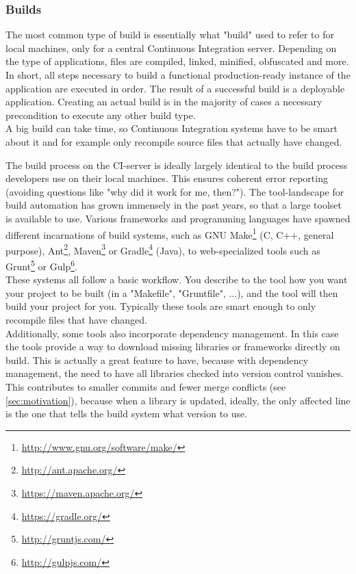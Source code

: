 \subsubsection{Builds}\label{sec:builds}

The most common type of build is essentially what "build" used to refer to for
local machines, only for a central Continuous Integration server. Depending on
the type of applications, files are compiled, linked, minified, obfuscated and
more. In short, all steps necessary to build a functional production-ready
instance of the application are executed in order. The result of a successful
build is a deployable application. Creating an actual build is in the majority of cases a necessary precondition to
execute any other build type.\\

A big build can take time, so Continuous Integration systems have to be smart
about it and for example only recompile source files that actually have changed.

The build process on the CI-server is ideally largely identical to the build
process developers use on their local machines. This ensures coherent error
reporting (avoiding questions like "why did it work for me, then?"). The
tool-landscape for build automation has grown immensely in the past years, so
that a large toolset is available to use. Various frameworks and programming
languages have spawned different incarnations of build systems, such as GNU
Make\footnote{\url{http://www.gnu.org/software/make/}} (C, C++, general
purpose), Ant\footnote{\url{http://ant.apache.org/}},
Maven\footnote{\url{https://maven.apache.org/}} or
Gradle\footnote{\url{https://gradle.org/}} (Java), to web-specialized tools such as
Grunt\footnote{\url{http://gruntjs.com/}} or
Gulp\footnote{\url{http://gulpjs.com/}}.\\

These systems all follow a basic workflow. You describe to the tool how you want
your project to be built (in a "Makefile", "Gruntfile", ...), and the tool will
then build your project for you. Typically these tools are smart enough to only
recompile files that have changed.\\

Additionally, some tools also incorporate dependency management. In this case
the tools provide a way to download missing libraries or frameworks directly on
build. This is actually a great feature to have, because with dependency
management, the need to have all libraries checked into version control
vanishes. This contributes to smaller commits and fewer merge conflicts (see
\ref{sec:motivation}), because
when a library is updated, ideally, the only affected line is the one that tells
the build system what version to use.\\

